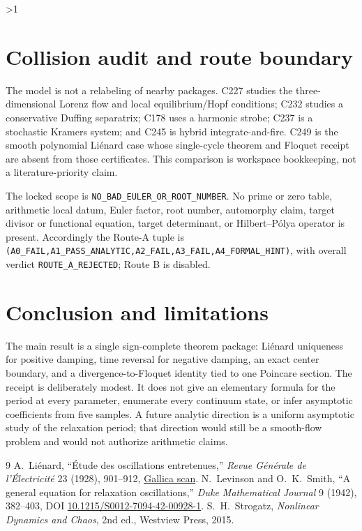 \documentclass[10pt]{article}
\begin{document}
\ifnum\CRevisionRound>1
\section{Collision audit and route boundary}
The model is not a relabeling of nearby packages.  C227 studies the
three-dimensional Lorenz flow and local equilibrium/Hopf conditions; C232
studies a conservative Duffing separatrix; C178 uses a harmonic strobe; C237
is a stochastic Kramers system; and C245 is hybrid integrate-and-fire.  C249
is the smooth polynomial Liénard case whose single-cycle theorem and Floquet
receipt are absent from those certificates.  This comparison is workspace
bookkeeping, not a literature-priority claim.

The locked scope is \texttt{NO\_BAD\_EULER\_OR\_ROOT\_NUMBER}.  No prime or
zero table, arithmetic local datum, Euler factor, root number, automorphy
claim, target divisor or functional equation, target determinant, or
Hilbert--Pólya operator is present.  Accordingly the Route-A tuple is
\texttt{(A0\_FAIL,A1\_PASS\_ANALYTIC,A2\_FAIL,A3\_FAIL,A4\_FORMAL\_HINT)},
with overall verdict \texttt{ROUTE\_A\_REJECTED}; Route B is disabled.
\fi

\section{Conclusion and limitations}
The main result is a single sign-complete theorem package: Liénard uniqueness
for positive damping, time reversal for negative damping, an exact center
boundary, and a divergence-to-Floquet identity tied to one Poincare section.
The receipt is deliberately modest.  It does not give an elementary formula
for the period at every parameter, enumerate every continuum state, or infer
asymptotic coefficients from five samples.  A future analytic direction is a
uniform asymptotic study of the relaxation period; that direction would still
be a smooth-flow problem and would not authorize arithmetic claims.

\begin{thebibliography}{9}
 A.~Liénard, ``Étude des oscillations entretenues,''
\emph{Revue Générale de l'Électricité} 23 (1928), 901--912,
\href{https://gallica.bnf.fr/ark:/12148/bpt6k5671115f}{Gallica scan}.
 N.~Levinson and O.~K.~Smith, ``A general equation
for relaxation oscillations,'' \emph{Duke Mathematical Journal} 9 (1942),
382--403, DOI
\href{https://doi.org/10.1215/S0012-7094-42-00928-1}{10.1215/S0012-7094-42-00928-1}.
 S.~H.~Strogatz, \emph{Nonlinear Dynamics and Chaos},
2nd ed., Westview Press, 2015.
\end{thebibliography}
\end{document}
